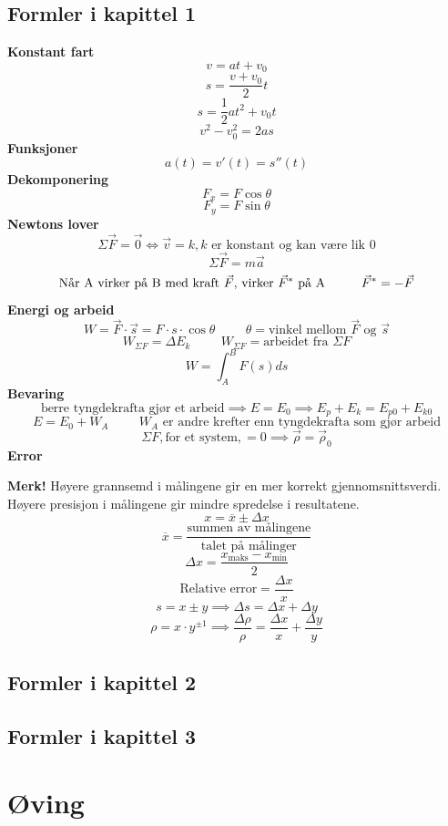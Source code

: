 \documentclass{article}
\numberwithin{equation}{section}
\begin{document}
\subsection{Formler i kapittel 1}
\textbf{Konstant fart}
\[v=at+v_0\]
\[s=\frac{v+v_0}{2}t\]
\[s=\frac 1 2 at^2+v_0t\]
\[v^2-v_0^2=2as\]
\textbf{Funksjoner}
\[a(t)=v'(t)=s''(t)\]
\textbf{Dekomponering}
\[F_x=F\cos\theta\]
\[F_y=F\sin\theta\]
\textbf{Newtons lover}
\[\Sigma \vec F = \vec 0 \iff \vec v = k, \text{$k$ er konstant og kan være lik 0}\]
\[\Sigma \vec F = m\vec a\]
\[\text{Når A virker på B med kraft $\vec F$, virker $\vec F^*$ på A}\hspace{1cm}\hfill\vec F^*=-\vec F\]
\textbf{Energi og arbeid}
\[W=\vec F\cdot\vec s=F\cdot s\cdot \cos\theta\hspace{1cm}\text{$\theta=$vinkel mellom $\vec F$ og $\vec s$}\]
\[W_{\Sigma F}=\Delta E_k\hspace{1cm} \text{$W_{\Sigma F}=$arbeidet fra $\Sigma F$}\]
\[W=\int_A^B F(s)ds\]
\textbf{Bevaring}
\[\text{berre tyngdekrafta gjør et arbeid}\implies E=E_0\implies E_p+E_k=E_{p0}+E_{k0}\]
\[E=E_0+W_A \hspace{1cm}\text{$W_A$ er andre krefter enn tyngdekrafta som gjør arbeid}\]
\[\Sigma F, \text{for et system}, = 0 \implies \vec\rho=\vec\rho_0\]
\textbf{Error}
\par
\small{\textbf{Merk!}
Høyere grannsemd i målingene gir en mer korrekt gjennomsnittsverdi. Høyere presisjon i målingene gir mindre spredelse i resultatene.}
\[x=\overline x\pm \Delta x\]
\[\overline x =\frac{\text{summen av målingene}}{\text{talet på målinger}}\]
\[\Delta x=\frac{x_{\text{maks}}-x_{\text{min}}}{2}\]
\[\text{Relative error}=\frac{\Delta x}{x}\]
\[s=x\pm y\implies \Delta s=\Delta x + \Delta y\]
\[\rho=x\cdot y^{\pm 1}\implies\frac{\Delta\rho}{\rho}=\frac{\Delta x}{x}+\frac{\Delta y}{y}\]
\subsection{Formler i kapittel 2}
\subsection{Formler i kapittel 3}
\section{Øving}
\end{document}
